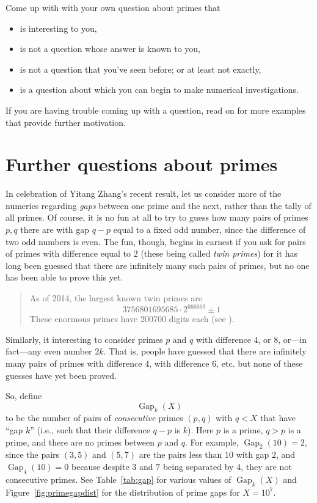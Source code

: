 \documentclass[openany]{book}
\DeclareMathOperator{\Gap}{Gap}
\theoremstyle{plain}
\theoremstyle{definition}
\begin{document}
Come up with with your own question about primes that
 \begin{itemize}
 \item     is interesting to you,
  \item    is not a question whose answer is known to you,
 \item     is not a question that you've seen before; or at least not exactly,
  \item    is a question about which you can begin to make numerical investigations.
 \end{itemize}
If you are having trouble coming up with a question, read on for more
examples that  provide further motivation.

\chapter{Further questions about primes\label{ch:further}}

In celebration of Yitang Zhang's recent result, let us consider more of the numerics
regarding {\em gaps} between one prime and the next, rather than the tally
of all primes. Of course, it is no fun at all to try to guess how many
pairs of primes $p, q$ there are with gap $q-p$ equal to a fixed odd
number, since the difference of two odd numbers is even.  The fun,
though, begins in earnest if you ask for pairs of primes with
difference equal to $2$ (these being called {\em twin primes}) for it
has long been guessed that there are infinitely many such pairs of
primes, but no one has been able to prove this yet.

\begin{quote} As of 2014, the largest known twin primes are
$$3756801695685\cdot 2^{666669} \pm 1$$
These enormous primes have $200700$ digits each (see ).
\end{quote}


Similarly, it interesting to consider primes $p$ and $q$
with difference $4$, or $8$, or---in fact---any even number
$2k$. That is, people have guessed that there are infinitely many
pairs of primes with difference $4$, with difference $6$, etc. but
none of these guesses have yet been proved.





So, define
$$
  \Gap_{k}(X)
$$
to be the number of pairs of {\em consecutive} primes $(p,q)$ with
$q<X$ that have ``gap $k$'' (i.e., such that their difference $q-p$ is
$k$).  Here $p$ is a prime, $q>p$ is a prime, and there are no primes
between $p$ and $q$.  For example, $\Gap_2(10) = 2$, since the pairs
$(3,5)$ and $(5,7)$ are the pairs less than $10$ with gap $2$,
and $\Gap_{4}(10)=0$ because despite $3$ and $7$ being separated
by $4$, they are not consecutive primes.
See Table~\ref{tab:gap} for various values of $\Gap_{k}(X)$ and
Figure~\ref{fig:primegapdist} for the distribution of prime gaps for
$X=10^7$.
\end{document}
